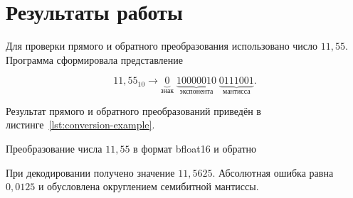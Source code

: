 \clearpage
\section{Результаты работы}

Для проверки прямого и обратного преобразования использовано число $11{,}55$.
Программа сформировала представление

\[
    11{,}55_{10}\longrightarrow
    \underbrace{0}_{\text{знак}}\;
    \underbrace{10000010}_{\text{экспонента}}\;
    \underbrace{0111001}_{\text{мантисса}}.
\]

Результат прямого и обратного преобразований приведён в
листинге~\ref{lst:conversion-example}.

    {Преобразование числа $11{,}55$ в формат bfloat16 и обратно}
    {\label{lst:conversion-example}}

При декодировании получено значение $11{,}5625$. Абсолютная ошибка равна
$0{,}0125$ и обусловлена округлением семибитной мантиссы.

\newpage
